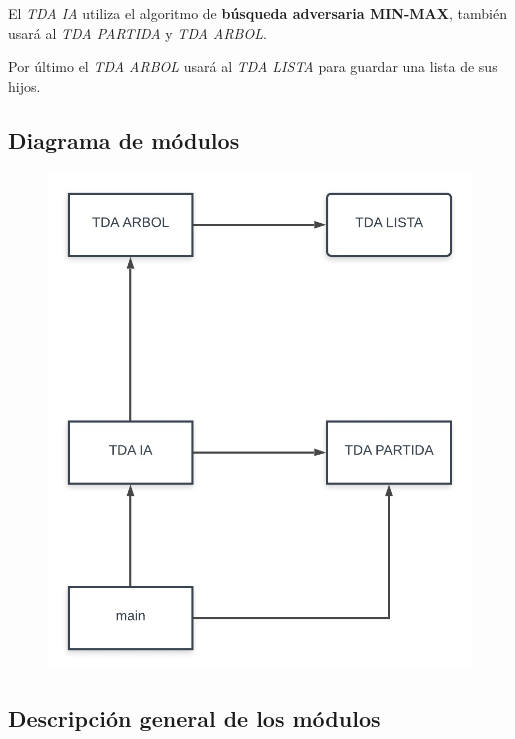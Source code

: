 \documentclass[12pt,a4paper]{article}
\begin{document}
    El {\itshape TDA IA} utiliza el algoritmo de {\bf b\'usqueda adversaria MIN-MAX}, tambi\'en usar\'a al {\itshape TDA PARTIDA} y {\itshape TDA ARBOL}.

    Por \'ultimo el {\itshape TDA ARBOL} usar\'a al {\itshape TDA LISTA} para guardar una lista de sus hijos.

\subsection{Diagrama de m\'odulos}
\begin{figure}[h!tbp]
	\centering
		\includegraphics[width=1.00\textwidth]{diagrama.jpg}
	\label{fig:diagrama}
\end{figure}

\newpage

\subsection{Descripci\'on general de los m\'odulos}
\end{document}
